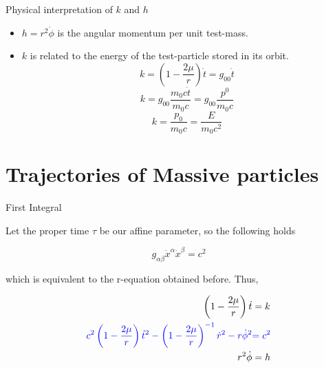 \documentclass[xcolor=dvipsnames]{beamer}
\begin{document}
\begin{frame}{Physical interpretation of $k$ and $h$}
    
    \begin{itemize}
        \item $h = r^2 \dot{\phi}$ is the angular momentum per unit test-mass. 
        \item $k$ is related to the energy of the test-particle stored in its orbit. 
        $$k =  \left( 1 - \frac{2 \mu}{r} \right) \dot{t} = g_{00} \dot{t}$$
        $$k = g_{00} \frac{m_0 c \dot{t}}{m_0 c} = g_{00} \frac{p^0}{m_0 c}$$
        $$k = \frac{p_0}{m_0 c} = \frac{E}{m_0 c^2}$$
    \end{itemize}
    
\end{frame}



\section{Trajectories of Massive particles}


\begin{frame}{First Integral}
    
Let the proper time $\tau$ be our affine parameter, so the following holds

\begin{equation*}
    g_{\alpha \beta} \dot{x}^\alpha \dot{x}^\beta = c^2
\end{equation*}

which is equivalent to the r-equation obtained before. Thus, 
    
\begin{block}{}
\begin{eqnarray*}
\left( 1 - \frac{2 \mu}{r} \right) \dot{t} &= k \\
{\color{blue} c^2 \left( 1 - \frac{2 \mu}{r} \right) \dot{t}^2  - \left( 1 - \frac{2 \mu}{r} \right)^{-1} \dot{r}^2 - r\dot{\phi}^2 } &{\color{blue}= c^2} \\
r^2 \dot{\phi} &= h
\end{eqnarray*}
\end{block}    
\end{frame}
\end{document}
